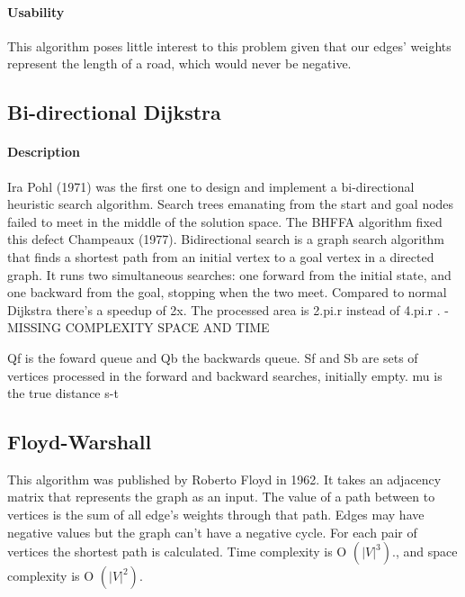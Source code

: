 \paragraph{Usability}
This algorithm poses little interest to this problem given that our edges' weights represent the length of a road, which would never be negative. 

\subsection{Bi-directional Dijkstra}
\paragraph{Description}
Ira Pohl (1971) was the first one to design and implement a bi-directional heuristic search algorithm. Search trees emanating from the start and goal nodes failed to meet in the middle of the solution space. The BHFFA algorithm fixed this defect Champeaux (1977).
Bidirectional search is a graph search algorithm that finds a shortest path from an initial vertex to a goal vertex in a directed graph. It runs two simultaneous searches: one forward from the initial state, and one backward from the goal, stopping when the two meet.
Compared to normal Dijkstra there's a speedup of 2x. The processed area is 2.pi.r instead of 4.pi.r .
-MISSING COMPLEXITY SPACE AND TIME

Qf is the foward queue and Qb the backwards queue.
Sf and Sb are sets of vertices processed in the forward and backward searches, initially empty.
mu is the true distance s-t
\begin{algorithm}

\end{algorithm}

\subsection{Floyd-Warshall}
This algorithm was published by Roberto Floyd in 1962.
It takes an adjacency matrix that represents the graph as an input. The value of a path between to vertices is the sum of all edge's weights through that path. Edges may have negative values but the graph can't have a negative cycle.
For each pair of vertices the shortest path is calculated. Time complexity is O \begin{math}(|V| ^3).\end{math}, and space complexity is O \begin{math}(|V| ^2).\end{math}



